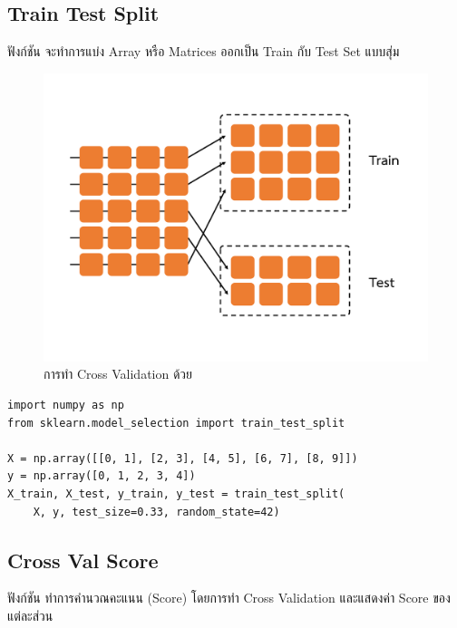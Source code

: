 \subsection{Train Test Split}
\label{ssec:train_test_split}

ฟังก์ชัน  จะทำการแบ่ง Array หรือ Matrices ออกเป็น Train กับ Test Set แบบสุ่ม

\begin{figure}[H]
    \centering
    \includegraphics[width=0.9\linewidth,page=1]{fig/cross_validation.pdf}
    \caption{การทำ Cross Validation ด้วย }
    \label{fig:train_test_split}
\end{figure}

\begin{lstlisting}[style=MyPython]
import numpy as np
from sklearn.model_selection import train_test_split

X = np.array([[0, 1], [2, 3], [4, 5], [6, 7], [8, 9]])
y = np.array([0, 1, 2, 3, 4])
X_train, X_test, y_train, y_test = train_test_split(
    X, y, test_size=0.33, random_state=42)
\end{lstlisting}

\subsection{Cross Val Score}
\label{ssec:cross_val_score}

ฟังก์ชัน  ทำการคำนวณคะแนน (Score) โดยการทำ Cross Validation และแสดงค่า Score ของแต่ละส่วน

